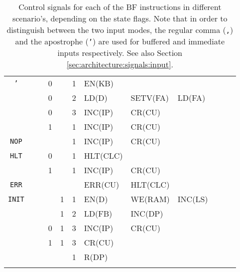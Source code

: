\begin{longtable}[c] {c|cccc|c|llllll}
    \rowcolor{Gray}   \texttt{'}  &   &   & 0     &      & 1     & EN(KB)   &          &         &        &        &        \\
    \rowcolor{Gray}               &   &   & 0     &      & 2     & LD(D)    & SETV(FA) & LD(FA)  &        &        &        \\
    \rowcolor{Gray}               &   &   & 0     &      & 3     & INC(IP)  & CR(CU)   &         &        &        &        \\
    \rowcolor{White}              &   &   & 1     &      & 1     & INC(IP)  & CR(CU)   &         &        &        &        \\ \hline
    
    \rowcolor{Gray}  \texttt{NOP} &   &   &       &      & 1     & INC(IP)  & CR(CU)   &         &        &        &        \\ \hline
    \rowcolor{White} \texttt{HLT} &   &   & 0     &      & 1     & HLT(CLC) &          &         &        &        &        \\ 
    \rowcolor{Gray}               &   &   & 1     &      & 1     & INC(IP)  & CR(CU)   &         &        &        &        \\ \hline        
    \rowcolor{White} \texttt{ERR} &   &   &       &      &       & ERR(CU)  & HLT(CLC) &         &        &        &        \\ \hline
    \rowcolor{Gray}  \texttt{INIT}&   &   &       & 1    & 1     & EN(D)    & WE(RAM)  & INC(LS) &        &        &        \\
    \rowcolor{Gray}               &   &   &       & 1    & 2     & LD(FB)   & INC(DP)  &         &        &        &        \\
    \rowcolor{Gray}               &   &   & 0     & 1    & 3     & INC(IP)  & CR(CU)   &         &        &        &        \\
    \rowcolor{White}              &   &   & 1     & 1    & 3     & CR(CU)   &          &         &        &        &        \\ \hline
    \rowcolor{Gray}               &   &   &       &      & 1     & R(DP)    &          &         &        &        &        \\ \hline
    

    \caption{Control signals for each of the BF instructions in different scenario's, depending on the state flags. Note that in order to distinguish between the two input modes, the regular comma (\texttt{,}) and the apostrophe (\texttt{'}) are used for buffered and immediate inputs respectively. See also Section \ref{sec:architecture:signals:input}.}
    \label{tab:microcode}
  \end{longtable}

